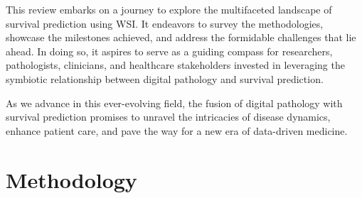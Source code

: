 \documentclass[journal,twoside,web]{ieeecolor}
\begin{document}
This review embarks on a journey to explore the multifaceted landscape of survival prediction using WSI. It endeavors to survey the methodologies, showcase the milestones achieved, and address the formidable challenges that lie ahead. In doing so, it aspires to serve as a guiding compass for researchers, pathologists, clinicians, and healthcare stakeholders invested in leveraging the symbiotic relationship between digital pathology and survival prediction.

As we advance in this ever-evolving field, the fusion of digital pathology with survival prediction promises to unravel the intricacies of disease dynamics, enhance patient care, and pave the way for a new era of data-driven medicine.

\section{Methodology}
\end{document}
